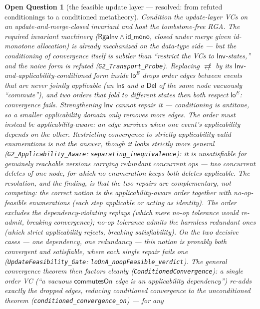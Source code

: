 \documentclass[11pt]{article}
\newtheorem{openq}[theorem]{Open Question}
\newcommand{\ncomm}{\not\rightleftarrows}
\newcommand{\loE}[1]{\mathsf{lo}^{#1}}
\newcommand{\lean}[1]{\texttt{#1}}
\begin{document}
\begin{openq}[the feasible update layer --- resolved: from refuted
conditionings to a conditioned metatheory]
Condition the update-layer VCs on an update-and-merge-closed invariant and
host the tombstone-free RGA. The required invariant machinery
($\mathsf{RgaInv} \wedge \mathsf{id\_mono}$, closed under merge given
id-monotone allocation) is already mechanized on the data-type side ---
but the \emph{conditioning of convergence itself} is subtler than
``restrict the VCs to $\mathsf{Inv}$-states,'' and the naive form is
refuted (\lean{G2\_Transport\_Probe}). Replacing $\ncomm$ by its
$\mathsf{Inv}$-and-applicability-conditioned form inside $\loE{E}$ drops
order edges between events that are \emph{never jointly applicable} (an
$\mathsf{Ins}$ and a $\mathsf{Del}$ of the same node vacuously
``commute''), and two orders that fold to different states then both
respect $\loE{E}$: convergence fails. Strengthening $\mathsf{Inv}$ cannot
repair it --- conditioning is antitone, so a smaller applicability domain
only removes more edges. The order must instead be
\emph{applicability-aware}: an edge survives when one event's
applicability \emph{depends} on the other. Restricting convergence to
strictly \emph{applicability-valid} enumerations is not the answer,
though it looks strictly more general (\lean{G2\_Applicability\_Aware}:
\lean{separating\_inequivalence}): it is \emph{unsatisfiable} for
genuinely reachable versions carrying \emph{redundant concurrent} ops ---
two concurrent deletes of one node, for which no enumeration keeps both
deletes applicable. The resolution, and the finding, is that the two
repairs are complementary, not competing: the correct notion is the
applicability-aware order \emph{together with} \emph{no-op-feasible}
enumerations (each step applicable \emph{or} acting as identity). The
order excludes the dependency-violating replays (which mere no-op
tolerance would re-admit, breaking convergence); no-op tolerance admits
the harmless redundant ones (which strict applicability rejects, breaking
satisfiability). On the two decisive cases --- one dependency, one
redundancy --- this notion is provably both convergent and satisfiable,
where each single repair fails one (\lean{UpdateFeasibility\_Gate}:
\lean{loOnA\_noopFeasible\_verdict}). The general convergence theorem then
factors cleanly (\lean{ConditionedConvergence}): a \emph{single} order VC
(``a vacuous $\mathsf{commutesOn}$ edge is an applicability dependency'')
re-adds exactly the dropped edges, reducing conditioned convergence to the
unconditioned theorem (\lean{conditioned\_convergence\_on}) --- for any

\end{openq}
\end{document}
